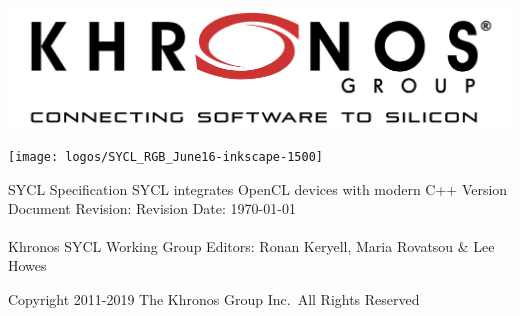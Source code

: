 \documentclass[10pt,twoside]{report}
\begin{document}

\ifx\showtodos\true
\listoftodos
\fi

\begin{titlepage}

\begin{center}

\begin{center}
\hfill\includegraphics[width=0.4\hsize]{logos/Khronos_Tagline_500px_June18}
\end{center}
\vskip 2cm

\begin{center}
\texttt{[image: logos/SYCL\_RGB\_June16-inkscape-1500]}
\end{center}

\vskip 1.5cm

{\Large SYCL\texttrademark{} Specification}
\vskip 0.5cm
{\Large SYCL\texttrademark{} integrates OpenCL\texttrademark{} devices
  with modern C++}
\vskip 1cm
{ Version \SYCLVERSION}
\vskip 0.2cm
{ Document Revision: \DOCUMENTVERSION}
\vskip 0.2cm
{ Revision Date: \today}


\vskip 1cm
{Khronos\textsuperscript{\textregistered} SYCL\texttrademark{}
  Working Group}
\vskip 0.2cm
{Editors: Ronan Keryell, Maria Rovatsou \& Lee Howes}

\vskip 1cm
\vbox{\hrulefill}
\vbox{Copyright 2011-2019 The Khronos\textregistered{} Group Inc.\ All
  Rights Reserved}
\end{center}

\end{titlepage}
\end{document}
